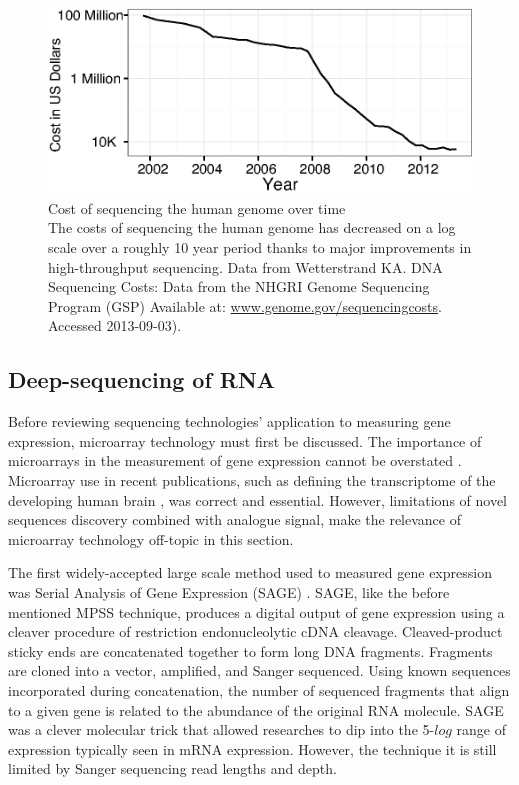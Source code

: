     \begin{figure} %
      \centering 
      \includegraphics{Figures/Intro/Sequencing_costs_over_time.eps}
      \caption[Cost of sequencing the human genome over time]
      {
        Cost of sequencing the human genome over time\\[0.25cm]
        The costs of sequencing the human genome has decreased on a log scale over a roughly 10 year period thanks to major improvements in high-throughput sequencing. Data from Wetterstrand KA. DNA Sequencing Costs: Data from the NHGRI Genome Sequencing Program (GSP) Available at: \url{www.genome.gov/sequencingcosts}. Accessed 2013-09-03).
        }
      \label{Intro:fig:SeqCosts}
      \end{figure}

  \subsection{Deep-sequencing of RNA}
    \label{Intro:subsec:Types of HTS}

    Before reviewing sequencing technologies' application to measuring gene expression, microarray technology must first be discussed. The importance of microarrays in the measurement of gene expression cannot be overstated \citep{Shendure2008,Marioni2008}. Microarray use in recent publications, such as defining the transcriptome of the developing human brain \cite{Miller2014}, was correct and essential. However, limitations of novel sequences discovery combined with analogue signal, make the relevance of microarray technology off-topic in this section.

    The first widely-accepted large scale method used to measured gene expression was Serial Analysis of Gene Expression (SAGE) \citep{Velculescu1995a}. SAGE, like the before mentioned MPSS technique, produces a digital output of gene expression using a cleaver procedure of restriction endonucleolytic cDNA cleavage. Cleaved-product sticky ends are concatenated together to form long DNA fragments. Fragments are cloned into a vector, amplified, and Sanger sequenced. Using known sequences incorporated during concatenation, the number of sequenced fragments that align to a given gene is related to the abundance of the original RNA molecule. SAGE was a clever molecular trick that allowed researches to dip into the 5-$log$ range of expression typically seen in mRNA expression. However, the technique it is still limited by Sanger sequencing read lengths and depth.

